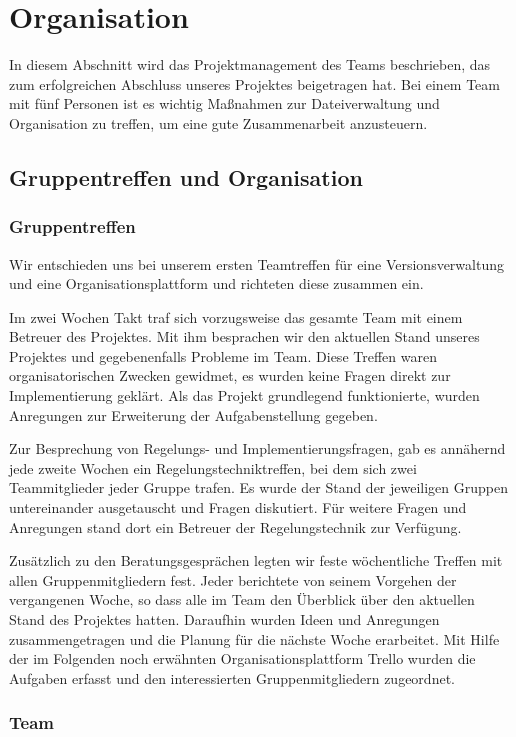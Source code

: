 \section{Organisation}
\label{cha:Organisation}
In diesem Abschnitt wird das Projektmanagement des Teams beschrieben, das zum erfolgreichen Abschluss unseres Projektes beigetragen hat. Bei einem Team mit fünf Personen ist es wichtig Maßnahmen zur Dateiverwaltung und Organisation zu treffen, um eine gute Zusammenarbeit anzusteuern.

\subsection{Gruppentreffen und Organisation}
\label{sec:gruppentreffenundorganisation}
\subsubsection*{Gruppentreffen}
Wir entschieden uns bei unserem ersten Teamtreffen für eine Versionsverwaltung und eine Organisationsplattform und richteten diese zusammen ein.

Im zwei Wochen Takt traf sich vorzugsweise das gesamte Team mit einem Betreuer des Projektes. Mit ihm besprachen wir den aktuellen Stand unseres Projektes und gegebenenfalls Probleme im Team. Diese Treffen waren organisatorischen Zwecken gewidmet, es wurden keine Fragen direkt zur Implementierung geklärt. Als das Projekt grundlegend funktionierte, wurden Anregungen zur Erweiterung der Aufgabenstellung gegeben. 

Zur Besprechung von Regelungs- und Implementierungsfragen, gab es annähernd jede zweite Wochen ein Regelungstechniktreffen, bei dem sich zwei Teammitglieder jeder Gruppe trafen. Es wurde der Stand der jeweiligen Gruppen untereinander ausgetauscht und Fragen diskutiert. Für weitere Fragen und Anregungen stand dort ein Betreuer der Regelungstechnik zur Verfügung.

Zusätzlich zu den Beratungsgesprächen legten wir feste wöchentliche Treffen mit allen Gruppenmitgliedern fest. Jeder berichtete von seinem Vorgehen der vergangenen Woche, so dass alle im Team den Überblick über den aktuellen Stand des Projektes hatten. Daraufhin wurden Ideen und Anregungen zusammengetragen und die Planung für die nächste Woche erarbeitet. Mit Hilfe der im Folgenden noch erwähnten Organisationsplattform Trello wurden die Aufgaben erfasst und den interessierten Gruppenmitgliedern zugeordnet. 

\subsubsection*{Team}

